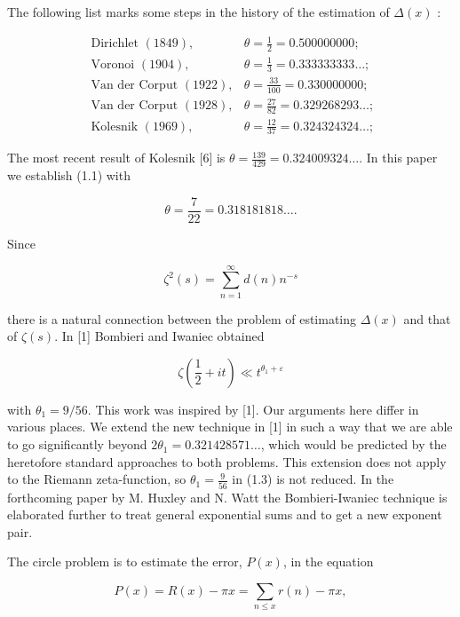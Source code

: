 \documentclass[10pt]{article}
\begin{document}
The following list marks some steps in the history of the estimation of $\Delta(x)$ :

$$
\begin{array}{ll}
\text { Dirichlet }(1849), & \theta=\frac{1}{2}=0.500000000 ; \\
\text { Voronoi }(1904), & \theta=\frac{1}{3}=0.333333333 \ldots ; \\
\text { Van der Corput }(1922), & \theta=\frac{33}{100}=0.330000000 ; \\
\text { Van der Corput }(1928), & \theta=\frac{27}{82}=0.329268293 \ldots ; \\
\text { Kolesnik }(1969), & \theta=\frac{12}{37}=0.324324324 \ldots ;
\end{array}
$$

The most recent result of Kolesnik [6] is $\theta=\frac{139}{429}=0.324009324\ldots$. In this paper we establish (1.1) with


\begin{equation*}
\theta=\frac{7}{22}=0.318181818 \ldots . \tag{1.2}
\end{equation*}


Since

$$
\zeta^{2}(s)=\sum_{n=1}^{\infty} d(n) n^{-s}
$$

there is a natural connection between the problem of estimating $\Delta(x)$ and that of $\zeta(s)$. In [1] Bombieri and Iwaniec obtained


\begin{equation*}
\zeta\left(\frac{1}{2}+i t\right) \ll t^{\theta_{1}+\varepsilon} \tag{1.3}
\end{equation*}


with $\theta_{1}=9 / 56$. This work was inspired by [1]. Our arguments here differ in various places. We extend the new technique in [1] in such a way that we are able to go significantly beyond $2 \theta_{1}=0.321428571 \ldots$, which would be predicted by the heretofore standard approaches to both problems. This extension does not apply to the Riemann zeta-function, so $\theta_{1}=\frac{9}{56}$ in (1.3) is not reduced. In the forthcoming paper by M. Huxley and N. Watt the Bombieri-Iwaniec technique is elaborated further to treat general exponential sums and to get a new exponent pair.

The circle problem is to estimate the error, $P(x)$, in the equation


\begin{equation*}
P(x)=R(x)-\pi x=\sum_{n \leqslant x} r(n)-\pi x, \tag{1.4}
\end{equation*}
\end{document}
